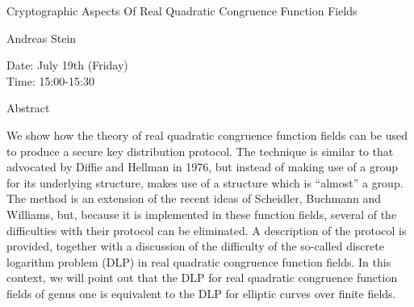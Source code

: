 \begin{center}
\LARGE
Cryptographic Aspects Of Real Quadratic Congruence
                        Function Fields 
\end{center}

\begin{center}
\Large
Andreas Stein
\end{center}

\noindent
Date:  July 19th (Friday)\\
Time: 15:00-15:30\\

\begin{center}
\large
Abstract
\end{center}

We show how the theory of real quadratic congruence function fields can be used to produce a
secure key distribution protocol. The technique is similar to that advocated by Diffie and Hellman
in 1976, but instead of making use of a group for its underlying structure, makes use of a structure
which is ``almost'' a group. The method is an extension of the recent ideas of Scheidler, Buchmann
and Williams, but, because it is implemented in these function fields, several of the difficulties
with their protocol can be eliminated. A description of the protocol is provided, together with a
discussion of the difficulty of the so-called discrete logarithm problem (DLP) in real quadratic
congruence function fields. In this context, we will point out that the DLP for real quadratic
congruence function fields of genus one is equivalent to the DLP for elliptic curves over finite
fields. 

